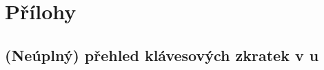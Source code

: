 \appendix
{}\thispagestyle{empty}  \renewcommand{\appendixname}{P\v{r}iloha}%


\part*{Přílohy}


\chapter[\noindent Přehled klávesových zkratek v Lyxu]{\noindent (Neúplný) přehled klávesových zkratek v \LyX{}u}


\section*{\noindent \label{tab:zkratky}}

